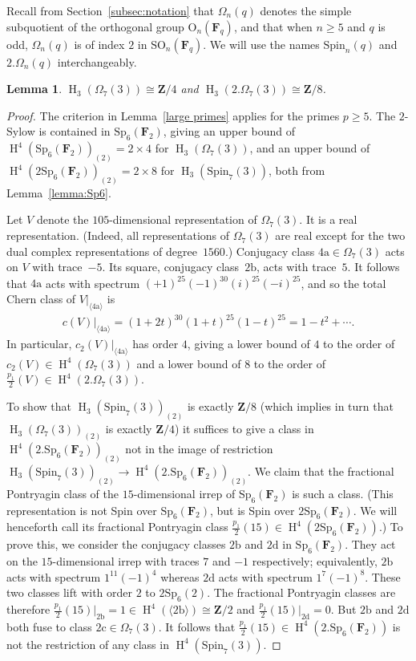 \documentclass[pdftex]{sigma}
\numberwithin{equation}{section}
\newtheorem{Lemma}[Theorem]{Lemma}
\newcommand\bF{\mathbf F}
\newcommand\bZ{\mathbf Z}
\newcommand\ra{\mathrm a}
\newcommand\rb{\mathrm b}
\newcommand\rc{\mathrm c}
\newcommand\rd{\mathrm d}
\DeclareMathOperator\homology{H}
\renewcommand\H{\homology}
\newcommand\<\langle
\renewcommand\>\rangle
\newcommand\Spin{\mathrm{Spin}}
\newcommand{\Sp}{\mathrm{Sp}}
\begin{document}
Recall from Section~\ref{subsec:notation} that $\Omega_n(q)$ denotes the simple subquotient of the orthogonal group $\mathrm{O}_n(\bF_q)$, and that when $n\geq 5$ and $q$ is odd, $\Omega_n(q)$ is of index $2$ in $\mathrm{SO}_n(\bF_q)$. We will use the names $\Spin_n(q)$ and $2.\Omega_n(q)$ interchangeably.

\begin{Lemma}\label{lemma:O73} $\H_3(\Omega_7(3)) \cong \bZ/4$ and $\H_3(2.\Omega_7(3)) \cong \bZ/8$.
\end{Lemma}

\begin{proof} The criterion in Lemma~\ref{large primes} applies for the primes $p\geq 5$.
 The $2$-Sylow is contained in $\Sp_6(\bF_2)$, giving an upper bound of
 $\H^4(\Sp_6(\bF_2))_{(2)} = 2 \times 4$ for $\H_3(\Omega_7(3))$, and an upper bound of $\H^4(2\Sp_6(\bF_2))_{(2)} = 2 \times 8$ for $\H_3(\Spin_7(3))$, both from Lemma~\ref{lemma:Sp6}.

 Let $V$ denote the $105$-dimensional representation of $\Omega_7(3)$. It is a real representation. (Indeed, all representations of $\Omega_7(3)$ are real except for the two dual complex representations of degree~$1560$.) Conjugacy class $4\ra \in \Omega_7(3)$ acts on $V$ with trace~$-5$. Its square, conjugacy class~$2\rb$, acts with trace~$5$. It follows that $4\ra$ acts with spectrum $(+1)^{25} (-1)^{30} (i)^{25} (-i)^{25}$, and so the total Chern class of $V|_{\langle4\ra\rangle}$ is
 \begin{gather*} c(V)|_{\langle 4\ra\rangle} = (1+2t)^{30} (1+t)^{25}(1-t)^{25} = 1 - t^2 + \cdots.\end{gather*}
 In particular, $c_2(V)|_{\langle 4\ra\rangle}$ has order $4$, giving a lower bound of $4$ to the order of $c_2(V) \in \H^4(\Omega_7(3))$ and a lower bound of $8$ to the order of $\frac{p_1}2(V) \in \H^4(2.\Omega_7(3))$.

 To show that $\H_3(\Spin_7(3))_{(2)}$ is exactly $\bZ/8$ (which implies in turn that $\H_3(\Omega_7(3))_{(2)}$ is exactly $\bZ/4$) it suffices to give a class in $\H^4(2.\Sp_6(\bF_2))_{(2)}$ not in the image of restriction $\H_3(\Spin_7(3))_{(2)} \to \H^4(2.\Sp_6(\bF_2))_{(2)}$. We claim that the fractional Pontryagin class of the $15$-dimensional irrep of $\Sp_6(\bF_2)$ is such a class. (This representation is not Spin over $\Sp_6(\bF_2)$, but is Spin over $2\Sp_6(\bF_2)$. We will henceforth call its fractional Pontryagin class $\frac{p_1}2(15) \in \H^4(2\Sp_6(\bF_2))$.) To prove this, we consider the conjugacy classes $2\rb$ and $2\rd$ in $\Sp_6(\bF_2)$. They act on the $15$-dimensional irrep with traces $7$ and $-1$ respectively; equivalently, $2\rb$ acts with spectrum $1^{11} (-1)^4$ whereas $2\rd$ acts with spectrum $1^7 (-1)^8$. These two classes lift with order $2$ to $2\Sp_6(2)$. The fractional Pontryagin classes are therefore $\frac{p_1}2(15)|_{2\rb} = 1 \in \H^4(\langle 2\rb\rangle) \cong \bZ/2$ and $\frac{p_1}2(15)|_{2\rd} = 0$. But $2\rb$ and $2\rd$ both fuse to class $2\rc \in \Omega_7(3)$. It follows that $\frac{p_1}2(15) \in \H^4(2.\Sp_6(\bF_2))$ is not the restriction of any class in $\H^4(\Spin_7(3))$.


\end{proof}
\end{document}
